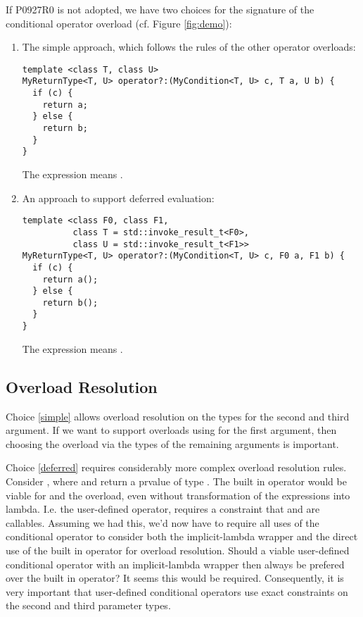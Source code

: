 If P0927R0 is not adopted, we have two choices for the signature of the conditional operator overload (cf. Figure \ref{fig:demo}):
\begin{enumerate}
  \item\label{simple} The simple approach, which follows the rules of the other operator overloads:\\
\begin{lstlisting}[style=Vc]
template <class T, class U>
MyReturnType<T, U> operator?:(MyCondition<T, U> c, T a, U b) {
  if (c) {
    return a;
  } else {
    return b;
  }
}
\end{lstlisting}

    The expression  means .

  \item\label{deferred} An approach to support deferred evaluation:\\
\begin{lstlisting}[style=Vc]
template <class F0, class F1,
          class T = std::invoke_result_t<F0>,
          class U = std::invoke_result_t<F1>>
MyReturnType<T, U> operator?:(MyCondition<T, U> c, F0 a, F1 b) {
  if (c) {
    return a();
  } else {
    return b();
  }
}
\end{lstlisting}

    The expression  means .

\end{enumerate}

\subsection{Overload Resolution}
Choice \ref{simple} allows overload resolution on the types for the second and third argument.
If we want to support overloads using \bool for the first argument, then choosing the overload via the types of the remaining arguments is important.

Choice \ref{deferred} requires considerably more complex overload resolution rules.
Consider , where  and  return a prvalue of type .
The built in operator would be viable for  and the overload, even without transformation of the expressions into lambda.
I.e. the user-defined operator, requires a constraint that  and  are callables.
Assuming we had this, we'd now have to require all uses of the conditional operator to consider both the implicit-lambda wrapper and the direct use of the built in operator for overload resolution.
Should a viable user-defined conditional operator with an implicit-lambda wrapper then always be prefered over the built in operator?
It seems this would be required.
Consequently, it is very important that user-defined conditional operators use exact constraints on the second and third parameter types.

